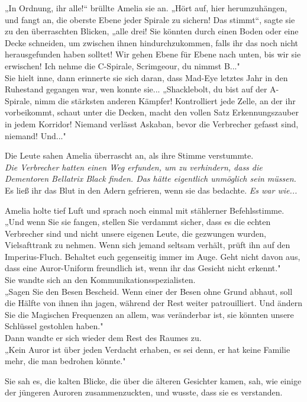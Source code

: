 {„In Ordnung, ihr alle!“ brüllte Amelia sie an. „Hört auf, hier herumzuhängen, und fangt an, die oberste Ebene jeder Spirale zu sichern! Das stimmt“, sagte sie zu den überraschten Blicken, „alle drei! Sie könnten durch einen Boden oder eine Decke schneiden, um zwischen ihnen hindurchzukommen, falls ihr das noch nicht herausgefunden haben solltet! Wir gehen Ebene für Ebene nach unten, bis wir sie erwischen! Ich nehme die C-Spirale, Scrimgeour, du nimmst B..."\\ Sie hielt inne, dann erinnerte sie sich daran, dass Mad-Eye letztes Jahr in den Ruhestand gegangen war, wen konnte sie... „Shacklebolt, du bist auf der A-Spirale, nimm die stärksten anderen Kämpfer! Kontrolliert jede Zelle, an der ihr vorbeikommt, schaut unter die Decken, macht den vollen Satz Erkennungszauber in jedem Korridor! Niemand verlässt Askaban, bevor die Verbrecher gefasst sind, niemand! Und..."

Die Leute sahen Amelia überrascht an, als ihre Stimme verstummte.\\ \emph{Die Verbrecher hatten einen Weg erfunden, um zu verhindern, dass die Dementoren Bellatrix Black finden. Das hätte eigentlich unmöglich sein müssen.} Es ließ ihr das Blut in den Adern gefrieren, wenn sie das bedachte. \emph{Es war wie...}

Amelia holte tief Luft und sprach noch einmal mit stählerner Befehlsstimme.\\ „Und wenn Sie sie fangen, stellen Sie verdammt sicher, dass es die echten Verbrecher sind und nicht unsere eigenen Leute, die gezwungen wurden, Vielsafttrank zu nehmen. Wenn sich jemand seltsam verhält, prüft ihn auf den Imperius-Fluch. Behaltet euch gegenseitig immer im Auge. Geht nicht davon aus, dass eine Auror-Uniform freundlich ist, wenn ihr das Gesicht nicht erkennt."\\ Sie wandte sich an den Kommunikationsspezialisten.\\ „Sagen Sie den Besen Bescheid. Wenn einer der Besen ohne Grund abhaut, soll die Hälfte von ihnen ihn jagen, während der Rest weiter patrouilliert. Und ändern Sie die Magischen Frequenzen an allem, was veränderbar ist, sie könnten unsere Schlüssel gestohlen haben."\\ Dann wandte er sich wieder dem Rest des Raumes zu.\\ „Kein Auror ist über jeden Verdacht erhaben, es sei denn, er hat keine Familie mehr, die man bedrohen könnte."

Sie sah es, die kalten Blicke, die über die älteren Gesichter kamen, sah, wie einige der jüngeren Auroren zusammenzuckten, und wusste, dass sie es verstanden.

}

